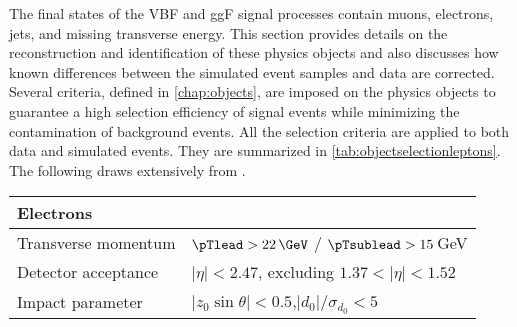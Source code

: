 The final states of the VBF and ggF signal processes contain muons, electrons, jets, and missing transverse energy. 
This section provides details on the reconstruction and identification of these physics objects and also discusses how known differences between the simulated event samples and data are corrected.
Several criteria, defined in \cref{chap:objects}, are imposed on the physics objects to guarantee a high selection efficiency of signal events while minimizing the contamination of background events. 
All the selection criteria are applied to both data and simulated events. They are summarized in \cref{tab:objectselectionleptons}.
The following draws extensively from .

\begin{table}
    \centering
    \begin{tabular}{l@{\hskip 0.5in} l}
        \toprule
        Electrons                &                                                              \\
        \midrule
        Transverse momentum      & $\pTlead > 22\,\GeV$ / $\pTsublead > 15\,$GeV        \\
        Detector acceptance      & $|\eta| < 2.47$, excluding $1.37 < |\eta| < 1.52$            \\
        Impact parameter         & $|z_0\sin\theta| < 0.5$,\quad $|d_0|/\sigma_{d_0} < 5$       \\


\end{tabular}
\end{table}
